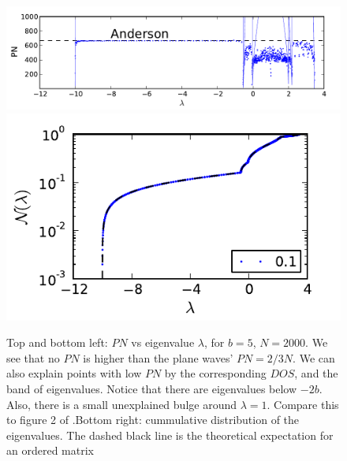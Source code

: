 \documentclass[onecolumn,fleqn,longbibliography]{revtex4}
\begin{document}
\begin{figure}[H]
    \includegraphics{pta_B_DD_low}\\
    \includegraphics{pta_B_DD_low_ev}
    \caption{Top and bottom left: $PN$ vs eigenvalue $\lambda$, for $b=5$, $N=2000$. We see that
    no $PN$ is higher than the plane waves' $PN =2/3 N$. We can also explain
    points with low $PN$ by the corresponding $DOS$, and the band of eigenvalues. 
    Notice that there are eigenvalues below $-2b$. Also, there is a small unexplained bulge around $\lambda=1$.
    Compare this to figure 2 of \cite{bodyfelt_scaling_2013}.\protect\footnotemark Bottom right: cummulative distribution
    of the eigenvalues. The dashed black line is the theoretical expectation
    for an ordered matrix}
    \label{fig:ddonly_b5}
\end{figure}
    
\end{document}

